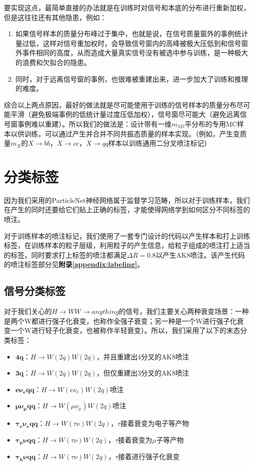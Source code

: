 要实现这点，最简单直接的办法就是在训练时对信号和本底的分布进行重新加权，但是这往往还有其他隐患，例如：
\begin{enumerate}[(1)]
    \item 如果信号样本的质量分布峰过于集中，也就是说，在信号质量窗外的事例统计量过低，这样对信号重加权时，会导致信号窗内的高峰被极大压低到和信号窗外事件相同的高度，从而造成大量真实信号没有被选中参与训练，是一种极大的浪费和欠拟合的隐患。
    \item 同时，对于远离信号窗的事例，也很难被重建出来，进一步加大了训练和推理的难度。
\end{enumerate}

综合以上两点原因，最好的做法就是尽可能使用于训练的信号样本的质量分布尽可能平滑（避免极端事例的低统计量过度压低加权），信号窗尽可能大（避免远离信号窗事例难以重建）。所以我们的做法是：设计带有一维$ m_{SD}$平分布的专用MC样本以供训练，可以通过产生并合并不同共振态质量的样本实现。（例如，产生变质量$m_X$的$X\to bb$，$X\to cc$，$X\to qq$样本以训练通用二分叉喷注标记）

\section{分类标签}
因为我们采用的ParticleNet神经网络属于监督学习范畴，所以对于训练样本，我们在产生的同时还要给它们贴上正确的标签，才能使得网络学到如何区分不同标签的喷注。

对于训练样本的喷注标记，我们使用了一套专门设计的代码\cite{dnntuples}以产生样本和打上训练标签，在训练样本的粒子层级，利用粒子的产生信息，给粒子组成的喷注打上适当的标签，同时要求打上标签的喷注都满足$\Delta R=0.8$以产生AK8喷注。该产生代码的喷注标签部分见\textbf{附录\ref{appendix:labeling}}。

\subsection{信号分类标签}
对于我们关心的$H\to WW\to anything$的信号，我们主要关心两种衰变场景：一种是两个W都进行强子化衰变，也称作全强子衰变；另一种是一个W进行强子化衰变一个W进行轻子化衰变，也被称作半轻衰变）。所以，我们采用了以下的末态分类标签：
\begin{itemize}
    \item $\mathbf{4q}$：$H\to W(2q)W(2q)$，并且重建出4分叉的AK8喷注
    \item $\mathbf{3q}$：$H\to W(2q)W(2q)$，但仅重建出3分叉的AK8喷注
    \item $\mathbf{e\nu_e qq}$：$H\to W(e\nu_e)W(2q)$喷注
    \item $\mathbf{\mu\nu_\mu qq}$：$H\to W(\mu\nu_\mu)W(2q)$喷注
    \item $\mathbf{\tau_e\nu_eqq}$：$H\to W(\tau\nu)W(2q)$，$\tau$接着衰变为电子等产物
    \item $\bm{\tau_\mu\nu qq}$：$H\to W(\tau\nu)W(2q)$，$\tau$接着衰变为$\mu$子等产物
    \item $\mathbf{\tau_h\nu qq}$：$H\to W(\tau\nu)W(2q)$，$\tau$接着进行强子化衰变
\end{itemize}
